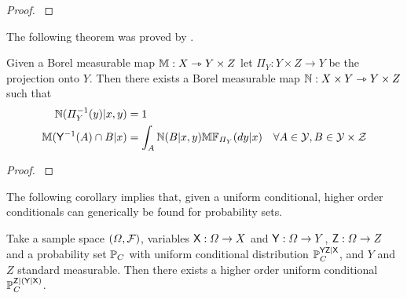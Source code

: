 \begin{proof}
\citet[Theorem 2.18]{cinlar_probability_2011}
\end{proof}

The following theorem was proved by \citet{bogachev_kantorovich_2020}.

\begin{theorem}\label{th:bogachev}
Given a Borel measurable map $\mathbb{M}:X\rightarrowtriangle Y\times Z$ let $\Pi_Y:Y\times Z\to Y$ be the projection onto $Y$. Then there exists a Borel measurable map $\mathbb{N}:X\times Y\rightarrowtriangle Y\times Z$ such that 
\begin{align}
    \mathbb{N}(\Pi_Y^{-1}(y)|x,y) &= 1\label{eq:proper}\\
    \mathbb{M}(\mathsf{Y}^{-1}(A)\cap B|x) &= \int_A \mathbb{N}(B|x,y) \mathbb{M}\mathbb{F}_{\Pi_Y}(dy|x)&\forall A\in \mathcal{Y},B\in\mathcal{Y\times Z}\label{eq:conditional1}
\end{align}
\end{theorem}

\begin{proof}
 \citet[Theorem 3.5]{bogachev_kantorovich_2020}
\end{proof}

The following corollary implies that, given a uniform conditional, higher order conditionals can generically be found for probability sets.

\begin{corollary}\label{th:ho_cond_psets}
Take a sample space $(\Omega,\mathcal{F})$, variables $\mathsf{X}:\Omega\to X$ and $\mathsf{Y}:\Omega\to Y$, $\mathsf{Z}:\Omega\to Z$ and a probability set $\mathbb{P}_C$ with uniform conditional distribution $\mathbb{P}_C^{\mathsf{YZ}|\mathsf{X}}$, and $Y$ and $Z$ standard measurable. Then there exists a higher order uniform conditional $\mathbb{P}_C^{\mathsf{Z}|(\mathsf{Y}|\mathsf{X})}$.
\end{corollary}

